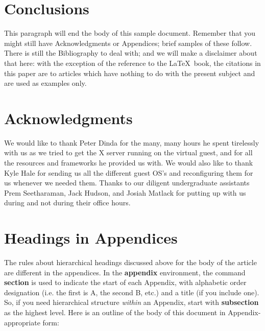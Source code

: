\documentclass{acm_proc_article-sp}
\begin{document}
\section{Conclusions}
This paragraph will end the body of this sample document.
Remember that you might still have Acknowledgments or
Appendices; brief samples of these
follow.  There is still the Bibliography to deal with; and
we will make a disclaimer about that here: with the exception
of the reference to the \LaTeX\ book, the citations in
this paper are to articles which have nothing to
do with the present subject and are used as
examples only.

\section{Acknowledgments}
We would like to thank Peter Dinda for the many, many hours he spent tirelessly with us as we
tried to get the X server running on the virtual guest, and for all the
resources and frameworks he provided us with. We would also like to thank Kyle
Hale for sending us all the different guest OS's and reconfiguring them for us
whenever we needed them. Thanks to our diligent undergraduate assistants Prem
Seetharaman, Jack Hudson, and Josiah Matlack for putting up with us during and
not during their office hours.
%
%
%
%
\appendix
\section{Headings in Appendices}
The rules about hierarchical headings discussed above for
the body of the article are different in the appendices.
In the \textbf{appendix} environment, the command
\textbf{section} is used to
indicate the start of each Appendix, with alphabetic order
designation (i.e. the first is A, the second B, etc.) and
a title (if you include one).  So, if you need
hierarchical structure
\textit{within} an Appendix, start with \textbf{subsection} as the
highest level. Here is an outline of the body of this
document in Appendix-appropriate form:
\end{document}
